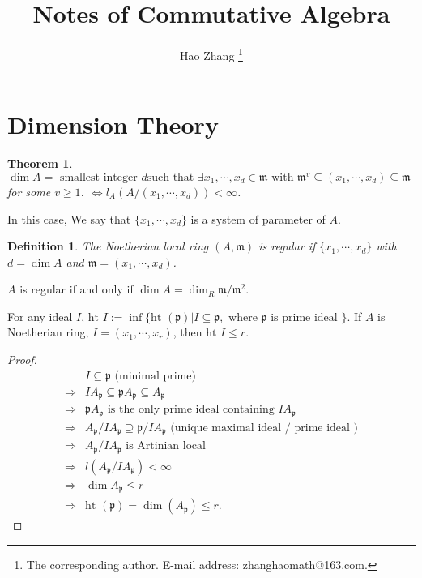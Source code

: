 \documentclass[cs4size]{article}
\newcommand{\su}{\subseteq}
\newcommand{\frm}{\mathfrak{m}}
\newcommand{\frp}{\mathfrak{p}}
\newtheorem{thm}{Theorem}
\newtheorem{definition}{Definition}
\begin{document}
\title{Notes of Commutative Algebra}
\author{Hao Zhang \footnote{The corresponding author. E-mail address:
zhanghaomath@163.com. }}
\date{}

\maketitle

\section{Dimension Theory}
\begin{thm}
$\dim A=\text{ smallest integer } d \text {such that }\exists x_1,\cdots,x_d\in \frm \text{ with } \frm^v\su(x_1,\cdots,x_d)\su\frm$ for some $v\geq 1$. $\Leftrightarrow l_A(A/(x_1,\cdots,x_d))<\infty$.
\end{thm}
In this case, We say that $\{x_1,\cdots,x_d\}$ is a system of parameter of $A$.

\begin{definition}
The Noetherian local ring $(A,\frm)$ is regular if $\{x_1,\cdots,x_d\}$ with $d=\dim A$ and $\frm=(x_1,\cdots,x_d)$.
\end{definition}
$A$ is regular if and only if $\dim A=\dim_R\frm/\frm^2$.

For any ideal $I$, $\text{ht } I:=\inf\{\text{ht }(\frp)|I\su\frp, \text{ where }\frp \text{ is prime ideal }\}$. If $A$ is Noetherian ring, $I=(x_1,\cdots,x_r)$, then $\text{ht } I\leq r$.
\begin{proof}
\begin{align*}
&I\su \frp \text{ (minimal prime) } \\
\Rightarrow& IA_\frp\su\frp A_\frp\su A_\frp\\
\Rightarrow&\frp A_\frp \text{ is the only prime ideal containing }IA_\frp\\
\Rightarrow&A_\frp/IA_\frp\supseteq\frp/I A_\frp \text{ (unique maximal ideal / prime ideal )}\\
\Rightarrow&A_\frp/IA_\frp \text{ is Artinian local }\\
\Rightarrow&l(A_\frp/IA_\frp)<\infty\\
\Rightarrow&\dim A_\frp\leq r\\
\Rightarrow&\text{ht }(\frp)=\dim(A_\frp)\leq r.
\end{align*}
\end{proof}
\end{document}
